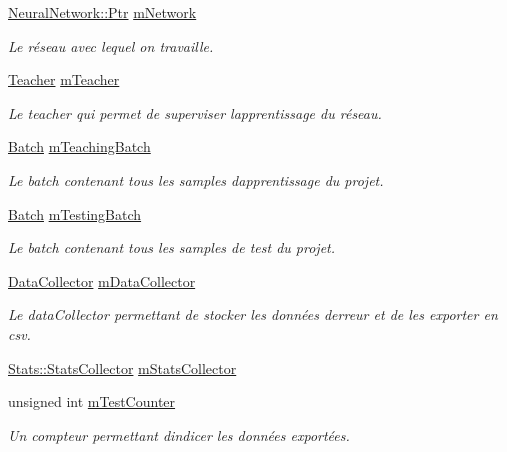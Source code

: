 \begin{DoxyCompactItemize}
\item 
\hyperlink{classNeuralNetwork_a31de381df65f261fd0f38e0559995d1a}{Neural\+Network\+::\+Ptr} \hyperlink{classApplication_aeec81cfdef16dae6f18bc7da55991e45}{m\+Network}
\begin{DoxyCompactList}\small\item\em Le réseau avec lequel on travaille. \end{DoxyCompactList}\item 
\hyperlink{classTeacher}{Teacher} \hyperlink{classApplication_aabafc2a40d05198496fed23f6fe1ea1f}{m\+Teacher}
\begin{DoxyCompactList}\small\item\em Le teacher qui permet de superviser l\textquotesingle{}apprentissage du réseau. \end{DoxyCompactList}\item 
\hyperlink{classApplication_a9888f02149ca3b8ffa499ee07426cd1d}{Batch} \hyperlink{classApplication_a2ccd850b23693fd6d76cad0975a597dd}{m\+Teaching\+Batch}
\begin{DoxyCompactList}\small\item\em Le batch contenant tous les samples d\textquotesingle{}apprentissage du projet. \end{DoxyCompactList}\item 
\hyperlink{classApplication_a9888f02149ca3b8ffa499ee07426cd1d}{Batch} \hyperlink{classApplication_a765dbdcf8fa110557c67fb78cffaceb3}{m\+Testing\+Batch}
\begin{DoxyCompactList}\small\item\em Le batch contenant tous les samples de test du projet. \end{DoxyCompactList}\item 
\hyperlink{classDataCollector}{Data\+Collector} \hyperlink{classApplication_a4409ee4b27b5142510e5be6d41d2a203}{m\+Data\+Collector}
\begin{DoxyCompactList}\small\item\em Le data\+Collector permettant de stocker les données d\textquotesingle{}erreur et de les exporter en csv. \end{DoxyCompactList}\item 
\hyperlink{classStats_1_1StatsCollector}{Stats\+::\+Stats\+Collector} \hyperlink{classApplication_a33f1c0f13d4c81101bb497264037cb82}{m\+Stats\+Collector}
\item 
unsigned int \hyperlink{classApplication_a3ee8257a9c7ece037ee91b68d9841002}{m\+Test\+Counter}
\begin{DoxyCompactList}\small\item\em Un compteur permettant d\textquotesingle{}indicer les données exportées. \end{DoxyCompactList}\end{DoxyCompactItemize}


